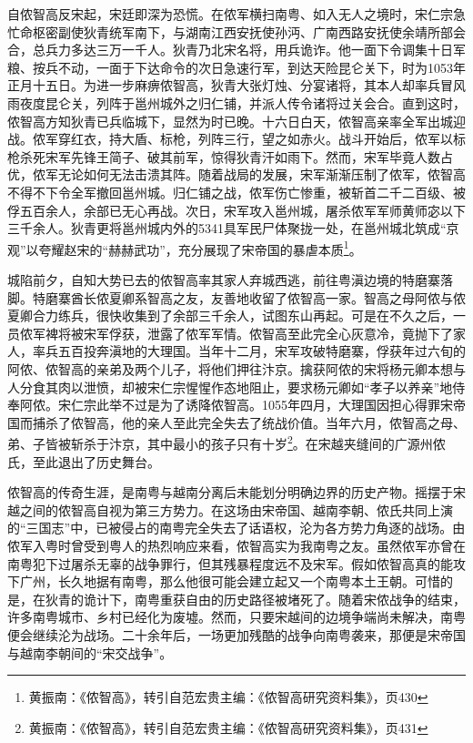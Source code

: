 自侬智高反宋起，宋廷即深为恐慌。在侬军横扫南粤、如入无人之境时，宋仁宗急忙命枢密副使狄青统军南下，与湖南江西安抚使孙沔、广南西路安抚使余靖所部会合，总兵力多达三万一千人。狄青乃北宋名将，用兵诡诈。他一面下令调集十日军粮、按兵不动，一面于下达命令的次日急速行军，到达天险昆仑关下，时为1053年正月十五日。为进一步麻痹侬智高，狄青大张灯烛、分宴诸将，其本人却率兵冒风雨夜度昆仑关，列阵于邕州城外之归仁铺，并派人传令诸将过关会合。直到这时，侬智高方知狄青已兵临城下，显然为时已晚。十六日白天，侬智高亲率全军出城迎战。侬军穿红衣，持大盾、标枪，列阵三行，望之如赤火。战斗开始后，侬军以标枪杀死宋军先锋王简子、破其前军，惊得狄青汗如雨下。然而，宋军毕竟人数占优，侬军无论如何无法击溃其阵。随着战局的发展，宋军渐渐压制了侬军，侬智高不得不下令全军撤回邕州城。归仁铺之战，侬军伤亡惨重，被斩首二千二百级、被俘五百余人，余部已无心再战。次日，宋军攻入邕州城，屠杀侬军军师黄师宓以下三千余人。狄青更将邕州城内外的5341具军民尸体聚拢一处，在邕州城北筑成“京观”以夸耀赵宋的“赫赫武功”，充分展现了宋帝国的暴虐本质\footnote{黄振南：《侬智高》，转引自范宏贵主编：《侬智高研究资料集》，页430}。

城陷前夕，自知大势已去的侬智高率其家人弃城西逃，前往粤滇边境的特磨寨落脚。特磨寨酋长侬夏卿系智高之友，友善地收留了侬智高一家。智高之母阿侬与侬夏卿合力练兵，很快收集到了余部三千余人，试图东山再起。可是在不久之后，一员侬军裨将被宋军俘获，泄露了侬军军情。侬智高至此完全心灰意冷，竟抛下了家人，率兵五百投奔滇地的大理国。当年十二月，宋军攻破特磨寨，俘获年过六旬的阿侬、侬智高的亲弟及两个儿子，将他们押往汴京。擒获阿侬的宋将杨元卿本想与人分食其肉以泄愤，却被宋仁宗惺惺作态地阻止，要求杨元卿如“孝子以养亲”地侍奉阿侬。宋仁宗此举不过是为了诱降侬智高。1055年四月，大理国因担心得罪宋帝国而捕杀了侬智高，他的亲人至此完全失去了统战价值。当年六月，侬智高之母、弟、子皆被斩杀于汴京，其中最小的孩子只有十岁\footnote{黄振南：《侬智高》，转引自范宏贵主编：《侬智高研究资料集》，页431}。在宋越夹缝间的广源州侬氏，至此退出了历史舞台。

侬智高的传奇生涯，是南粤与越南分离后未能划分明确边界的历史产物。摇摆于宋越之间的侬智高自视为第三方势力。在这场由宋帝国、越南李朝、侬氏共同上演的“三国志”中，已被侵占的南粤完全失去了话语权，沦为各方势力角逐的战场。由侬军入粤时曾受到粤人的热烈响应来看，侬智高实为我南粤之友。虽然侬军亦曾在南粤犯下过屠杀无辜的战争罪行，但其残暴程度远不及宋军。假如侬智高真的能攻下广州，长久地据有南粤，那么他很可能会建立起又一个南粤本土王朝。可惜的是，在狄青的诡计下，南粤重获自由的历史路径被堵死了。随着宋侬战争的结束，许多南粤城市、乡村已经化为废墟。然而，只要宋越间的边境争端尚未解决，南粤便会继续沦为战场。二十余年后，一场更加残酷的战争向南粤袭来，那便是宋帝国与越南李朝间的“宋交战争”。


